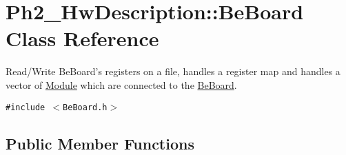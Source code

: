 \hypertarget{class_ph2___hw_description_1_1_be_board}{
\section{Ph2\_\-Hw\-Description::Be\-Board Class Reference}
\label{class_ph2___hw_description_1_1_be_board}
}
Read/Write Be\-Board's registers on a file, handles a register map and handles a vector of \hyperlink{class_ph2___hw_description_1_1_module}{Module} which are connected to the \hyperlink{class_ph2___hw_description_1_1_be_board}{Be\-Board}.  


{\tt \#include $<$Be\-Board.h$>$}

\subsection*{Public Member Functions}

